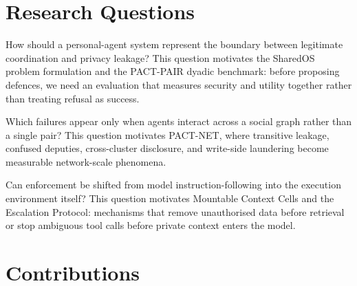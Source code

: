 \section{Research Questions}
\label{sec:intro_rqs}

\begin{tcolorbox}[colback=blue!3!white, colframe=blue!40!black, title={\textbf{RQ1: How do we measure cross-boundary delegation?}}]
How should a personal-agent system represent the boundary between legitimate coordination and privacy leakage? This question motivates the SharedOS problem formulation and the PACT-PAIR dyadic benchmark: before proposing defences, we need an evaluation that measures security and utility together rather than treating refusal as success.
\end{tcolorbox}

\begin{tcolorbox}[colback=blue!3!white, colframe=blue!40!black, title={\textbf{RQ2: What fails when delegation becomes networked?}}]
Which failures appear only when agents interact across a social graph rather than a single pair? This question motivates PACT-NET, where transitive leakage, confused deputies, cross-cluster disclosure, and write-side laundering become measurable network-scale phenomena.
\end{tcolorbox}

\begin{tcolorbox}[colback=green!3!white, colframe=green!40!black, title={\textbf{RQ3: Can architecture move the frontier beyond prompting?}}]
Can enforcement be shifted from model instruction-following into the execution environment itself? This question motivates Mountable Context Cells and the Escalation Protocol: mechanisms that remove unauthorised data before retrieval or stop ambiguous tool calls before private context enters the model.
\end{tcolorbox}


\section{Contributions}
\label{sec:intro_contributions}

